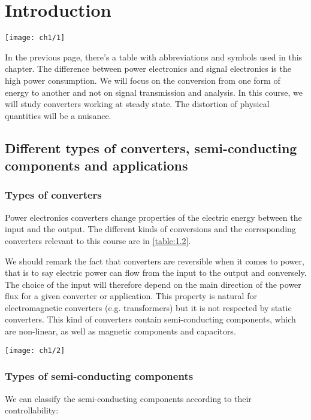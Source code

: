 
\chapter{Introduction}
	
	\begin{center}
		\texttt{[image: ch1/1]}
		\label{table:1.1}
	\end{center}
	
	In the previous page, there's a table with abbreviations and symbols used in this chapter.
	The difference between power electronics and signal electronics is the high power consumption. We will focus on the conversion from one form of energy to another and not on signal transmission and analysis. In this course, we will study converters working at steady state. The distortion of physical quantities will be a nuisance.
	
\section{Different types of converters, semi-conducting components and applications}
	\subsection{Types of converters}
		Power electronics converters change properties of the electric energy between the input and the output. The different kinds of conversions and the corresponding converters relevant to this course are in \autoref{table:1.2}.
		
		We should remark the fact that converters are reversible when it comes to power, that is to say electric power can flow from the input to the output and conversely. The choice of the input will therefore depend on the main direction of the power flux for a given converter or application. This property is natural for electromagnetic converters (e.g. transformers) but it is not respected by static converters. This kind of converters contain semi-conducting components, which are non-linear, as well as magnetic components and capacitors.
		

		\begin{center}
			\texttt{[image: ch1/2]}
			\label{table:1.2}
		\end{center}
		
	\subsection{Types of semi-conducting components}
	    We can classify the semi-conducting components according to their controllability: 

